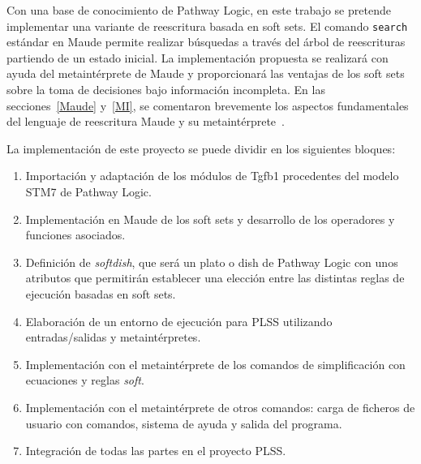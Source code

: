 Con una base de conocimiento de Pathway Logic, en este trabajo se pretende implementar una variante de reescritura basada en soft sets. El comando \texttt{search} estándar en Maude permite realizar búsquedas a través del árbol de reescrituras partiendo de un estado inicial. La implementación propuesta se realizará con ayuda del metaintérprete de Maude y proporcionará las ventajas de los soft sets sobre la toma de decisiones bajo información incompleta. 
En las secciones~\ref{Maude} y~\ref{MI}, se comentaron brevemente los aspectos fundamentales del lenguaje de reescritura Maude y su metaintérprete~\citep{maude30}.
\bigskip


La implementación de este proyecto se puede dividir en los siguientes bloques:
\begin{enumerate}
\item Importación y adaptación de los módulos de Tgfb1 procedentes del modelo STM7 de Pathway Logic.
\item Implementación en Maude de los soft sets y desarrollo de los operadores y funciones asociados.
\item Definición de \textit{softdish}, que será un plato o dish de Pathway Logic con unos atributos que permitirán establecer una elección entre las distintas reglas de ejecución basadas en soft sets.
\item Elaboración de un entorno de ejecución para PLSS utilizando entradas/salidas y metaintérpretes.
\item Implementación con el metaintérprete de los comandos de simplificación con ecuaciones y reglas \textit{soft}.
\item Implementación con el metaintérprete de otros comandos: carga de ficheros de usuario con comandos, sistema de ayuda y salida del programa.
\item Integración de todas las partes en el proyecto PLSS.
\end{enumerate}
\medskip


